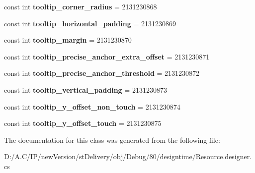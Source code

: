 \begin{DoxyCompactItemize}
\item 
\mbox{\label{classst_delivery_1_1_resource_1_1_dimension_a0e9348dda89ccd712caf5b1f54f5c9a5}} 
const int {\bfseries tooltip\+\_\+corner\+\_\+radius} = 2131230868
\item 
\mbox{\label{classst_delivery_1_1_resource_1_1_dimension_a21da90a56af9c79b09dae1a0758d57ad}} 
const int {\bfseries tooltip\+\_\+horizontal\+\_\+padding} = 2131230869
\item 
\mbox{\label{classst_delivery_1_1_resource_1_1_dimension_a76c108016dfbcc646bc2060a5982d74e}} 
const int {\bfseries tooltip\+\_\+margin} = 2131230870
\item 
\mbox{\label{classst_delivery_1_1_resource_1_1_dimension_ad1b2d1f25b2aed3e00ad657622ebdf31}} 
const int {\bfseries tooltip\+\_\+precise\+\_\+anchor\+\_\+extra\+\_\+offset} = 2131230871
\item 
\mbox{\label{classst_delivery_1_1_resource_1_1_dimension_a1e2a93f78f9c4857d7204d912e5db620}} 
const int {\bfseries tooltip\+\_\+precise\+\_\+anchor\+\_\+threshold} = 2131230872
\item 
\mbox{\label{classst_delivery_1_1_resource_1_1_dimension_a84c8caf7d2231fd90ed8e2dc7bf99922}} 
const int {\bfseries tooltip\+\_\+vertical\+\_\+padding} = 2131230873
\item 
\mbox{\label{classst_delivery_1_1_resource_1_1_dimension_ad73b2766ce2d1706bfa0b0aa6c071913}} 
const int {\bfseries tooltip\+\_\+y\+\_\+offset\+\_\+non\+\_\+touch} = 2131230874
\item 
\mbox{\label{classst_delivery_1_1_resource_1_1_dimension_a7ec395ba2c235a38267f424f1189092f}} 
const int {\bfseries tooltip\+\_\+y\+\_\+offset\+\_\+touch} = 2131230875
\end{DoxyCompactItemize}


The documentation for this class was generated from the following file\+:\begin{DoxyCompactItemize}
\item 
D\+:/\+A.\+C/\+I\+P/new\+Version/st\+Delivery/obj/\+Debug/80/designtime/Resource.\+designer.\+cs\end{DoxyCompactItemize}
